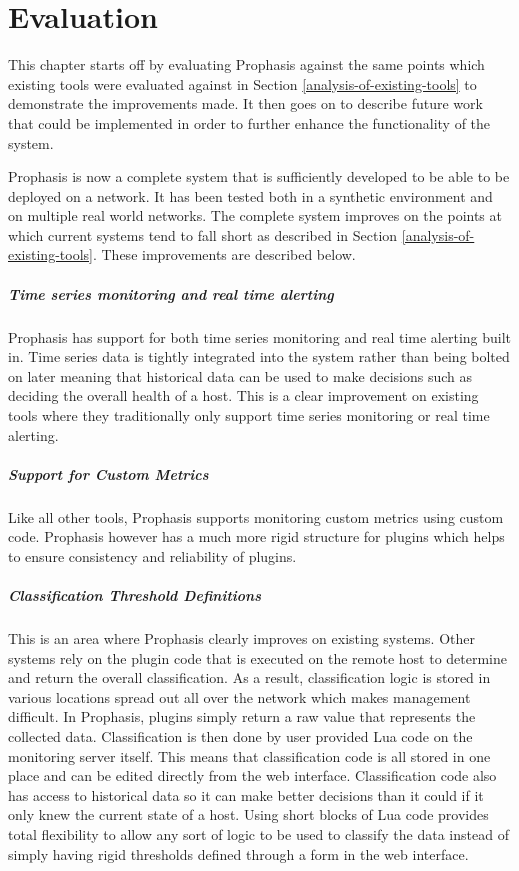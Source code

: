 \documentclass[bsc,logo,twoside,parskip,singlespacing,notimes]{infthesis}
\begin{document}
\chapter{Evaluation}
	This chapter starts off by evaluating Prophasis against the same points which
	existing tools were evaluated against in Section
	\ref{analysis-of-existing-tools} to demonstrate the improvements made. It then
	goes on to describe future work that could be implemented in order to further
	enhance the functionality of the system.

	Prophasis is now a complete system that is sufficiently developed to be able to
	be deployed on a network.  It has been tested both in a synthetic environment
	and on multiple real world networks.  The complete system improves on
	the points at which current systems tend to fall short as described in Section
	\ref{analysis-of-existing-tools}. These improvements are described below.

\paragraph*{Time series monitoring and real time alerting}
	Prophasis has support for both time series monitoring and real time alerting
	built in.  Time series data is tightly integrated into the system rather than
	being bolted on later meaning that historical data can be used to make
	decisions such as deciding the overall health of a host.  This is a clear improvement
	on existing tools where they traditionally only support time series monitoring
	or real time alerting.

\paragraph*{Support for Custom Metrics}
	Like all other tools, Prophasis supports monitoring custom metrics using custom
	code.  Prophasis however has a much more rigid structure for plugins which
	helps to ensure consistency and reliability of plugins.

\paragraph*{Classification Threshold Definitions}
	This is an area where Prophasis clearly improves on existing systems.  Other
	systems rely on the plugin code that is executed on the remote host to
	determine and return the overall classification. As a result, classification
	logic is stored in various locations spread out all over the network which makes
	management difficult.  In
	Prophasis, plugins simply return a raw
	value that represents the collected data. Classification is then done by user
	provided Lua code on the monitoring server itself.  This means that
	classification code is all stored in one place and can be edited directly from
	the web interface.  Classification code also has access to historical data so
	it can make better decisions than it could if it only knew the current state of
	a host.  Using short blocks of Lua code provides total flexibility to allow any
	sort of logic to be used to classify the data instead of simply having
	rigid thresholds defined through a form in the web interface.
\end{document}

